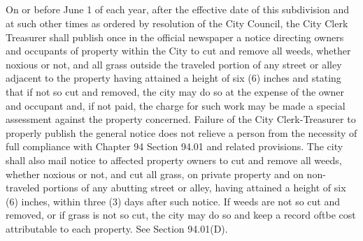 \subsection{}
On or before June 1 of each year, after the effective date of this subdivision and at such other times as ordered by resolution of the City Council, the City Clerk Treasurer shall publish once in the official newspaper a notice directing owners and occupants of property within the City to cut and remove all weeds, whether noxious or not, and all grass outside the traveled portion of any street or alley adjacent to the property having attained a height of six (6) inches and stating that if not so cut and removed, the city may do so at the expense of the owner and occupant and, if not paid, the charge for such work may be made a special assessment against the property concerned. Failure of the City Clerk-Treasurer to properly publish the general notice does not relieve a person from the necessity of full compliance with Chapter 94 Section 94.01 and related provisions. The city shall also mail notice to affected property owners to cut and remove all weeds, whether noxious or not, and cut all grass, on private property and on non-traveled portions of any abutting street or alley, having attained a height of six (6) inches, within three (3) days after such notice. If weeds are not so cut and removed, or if grass is not so cut, the city may do so and keep a record oftbe cost attributable to each property. See Section 94.01(D).
